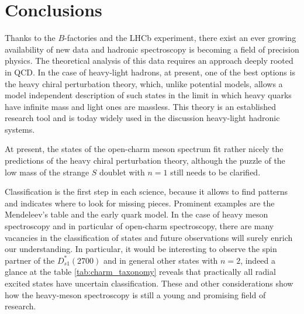 \chapter{Conclusions}

Thanks to the $B$-factories and the LHCb experiment, there exist an ever growing availability of new data and hadronic spectroscopy is becoming a field of precision physics. The theoretical analysis of this data requires an approach deeply rooted in QCD. In the case of heavy-light hadrons, at present, one of the best options is the heavy chiral perturbation theory, which, unlike potential models, allows a model independent description of such states in the limit in which heavy quarks have infinite mass and light ones are massless. This theory is an established research tool and is today widely used in the discussion heavy-light hadronic systems.

At present, the states of the open-charm meson spectrum fit rather nicely the predictions of the heavy chiral perturbation theory, although the puzzle of the low mass of the strange $S$ doublet with $n = 1$ still needs to be clarified. 


Classification is the first step in each science, because it allows to find patterns and indicates where to look for missing pieces. Prominent examples are the Mendeleev's table and the early quark model. In the case of heavy meson spectroscopy and in particular of open-charm spectroscopy, there are many vacancies in the classification of states and future observations will surely enrich our understanding. In particular, it would be interesting to observe the spin partner of the $D^*_{s 1}(2700)$ and in general other states with $n = 2$, indeed a glance at the table \ref{tab:charm_taxonomy} reveals that practically all radial excited states have uncertain classification. These and other considerations show how the heavy-meson spectroscopy is still a young and promising field of research.

